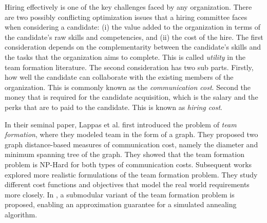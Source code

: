 Hiring effectively is one of the key challenges faced by any organization.
There are two possibly conflicting optimization issues that a hiring committee faces when considering a candidate: 
(i) the value added to the organization in terms of the candidate's raw skills and competencies, and 
(ii) the cost of the hire. 
The first consideration depends on the complementarity between the candidate's skills and the tasks that the organization aims to complete. 
This is called \textit{utility} in the team formation literature.
The second consideration has two sub parts. Firstly, how well the candidate can collaborate with the existing members of the organization. This is commonly known as the \textit{communication cost}. Second the money that is required for the candidate acquisition, which is the salary and the perks that are to paid to the candidate. This is known as \textit{hiring cost}.

In their seminal paper, Lappas et al. \cite{lappas2009finding} first introduced the problem of \textit{team formation}, where they modeled team in the form of a graph.
They proposed two graph distance-based measures of communication cost, namely the diameter and minimum spanning tree of the graph. 
They showed that the team formation problem is NP-Hard for both types of communication costs. 
Subsequent works  \cite{sozio2010community, kargar2011discovering, anagnostopoulos2010power, rangapuram2013towards} explored more realistic formulations of the team formation problem. They study different cost functions and objectives that model the real world requirements more closely.
In \cite{bhowmik2014submodularity}, a submodular variant of the team formation problem is proposed, enabling an approximation guarantee for a simulated annealing algorithm.

